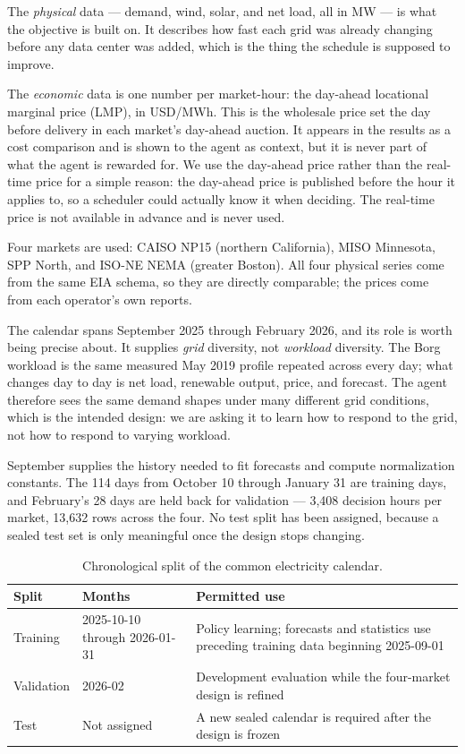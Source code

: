 ﻿\documentclass[12pt]{article}
\begin{document}
The \emph{physical} data --- demand, wind, solar, and net load, all in MW --- is
what the objective is built on. It describes how fast each grid was already
changing before any data center was added, which is the thing the schedule is
supposed to improve.

The \emph{economic} data is one number per market-hour: the day-ahead locational
marginal price (LMP), in USD/MWh. This is the wholesale price set the day
before delivery in each market's day-ahead auction. It appears in the results as
a cost comparison and is shown to the agent as context, but it is never part of
what the agent is rewarded for. We use the day-ahead price rather than the
real-time price for a simple reason: the day-ahead price is published before the
hour it applies to, so a scheduler could actually know it when deciding. The
real-time price is not available in advance and is never used.

Four markets are used: CAISO NP15 (northern California), MISO Minnesota, SPP
North, and ISO-NE NEMA (greater Boston). All four physical series come from the
same EIA schema, so they are directly comparable; the prices come from each
operator's own reports.

The calendar spans September 2025 through February 2026, and its role is worth
being precise about. It supplies \emph{grid} diversity, not \emph{workload}
diversity. The Borg workload is the same measured May 2019 profile repeated
across every day; what changes day to day is net load, renewable output, price,
and forecast. The agent therefore sees the same demand shapes under many
different grid conditions, which is the intended design: we are asking it to
learn how to respond to the grid, not how to respond to varying workload.

September supplies the history needed to fit forecasts and compute
normalization constants. The 114 days from October 10 through January 31 are
training days, and February's 28 days are held back for validation --- 3,408
decision hours per market, 13,632 rows across the four. No test split has been
assigned, because a sealed test set is only meaningful once the design stops
changing.

\begin{table}[htbp]
  \centering
  \caption{Chronological split of the common electricity calendar.}
  \label{tab:energy-calendar}
  \begin{tabular}{@{}L{0.13\textwidth}L{0.23\textwidth}L{0.54\textwidth}@{}}
    \toprule
    Split & Months & Permitted use \\
    \midrule
    Training
      & 2025-10-10 through 2026-01-31
      & Policy learning; forecasts and statistics use preceding training data
        beginning 2025-09-01 \\
    Validation
      & 2026-02
      & Development evaluation while the four-market design is refined \\
    Test
      & Not assigned
      & A new sealed calendar is required after the design is frozen \\
    \bottomrule
  \end{tabular}
\end{table}
\end{document}
